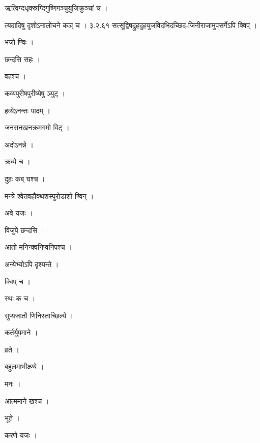 \documentclass[10pt, openany]{book}
\begin{document}
\noindent ऋत्विग्दधृक्स्रग्दिगुष्णिगञ्चुयुजिक्रुञ्चां च ।

\noindent त्यदादिषु दृशोऽनालोचने कञ् च । ३.२.६१ सत्सूद्विषद्रुहदुहयुजविदभिदच्छिद-जिनीराजामुपसर्गेऽपि क्विप् ।

\noindent भजो ण्विः ।

\noindent छन्दसि सहः ।

\noindent वहश्च ।

\noindent कव्यपुरीषपुरीष्येषु ञ्युट् ।

\noindent हव्येऽनन्तः पादम् ।

\noindent जनसनखनक्रमगमो विट् ।

\noindent अदोऽनन्ने ।

\noindent क्रव्ये च ।

\noindent दुहः कब् घश्च ।

\noindent मन्त्रे श्वेतवहौक्थशस्पुरोडाशो ण्विन् ।

\noindent अवे यजः ।

\noindent विजुपे छन्दसि ।

\noindent आतो मनिन्क्वनिप्वनिपश्च ।

\noindent अन्येभ्योऽपि दृश्यन्ते ।

\noindent क्विप् च ।

\noindent स्थः क च ।

\noindent सुप्यजातौ णिनिस्ताच्छिल्ये ।

\noindent कर्तर्युपमाने ।

\noindent व्रते ।

\noindent बहुलमाभीक्ष्ण्ये ।

\noindent मनः ।

\noindent आत्ममाने खश्च ।

\noindent भूते ।

\noindent करणे यजः ।
\end{document}
